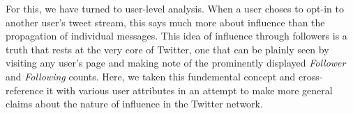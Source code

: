 For this, we have turned to user-level analysis.  When a user choses to opt-in to another user's tweet stream, this says much more about influence than the propagation of individual messages.  This idea of influence through followers is a truth that rests at the very core of Twitter, one that can be plainly seen by visiting any user's page and making note of the prominently displayed \textit{Follower} and \textit{Following} counts.  Here, we taken this fundemental concept and cross-reference it with various user attributes in an attempt to make more general claims about the nature of influence in the Twitter network.